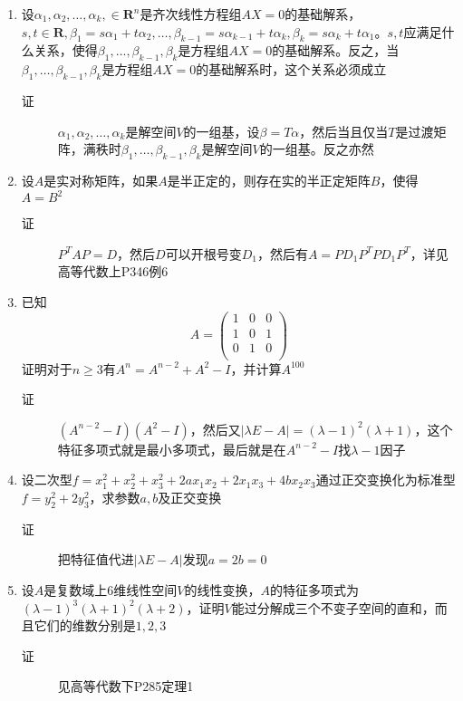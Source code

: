 \begin{enumerate}
\item 设$\alpha_1,\alpha_2,\dots,\alpha_k,\in \mathbf{R}^n$是齐次线性方程组$AX=0$的基础解系，$s,t\in \mathbf{R},\beta_1=s\alpha_1+t\alpha_2,\dots,\beta_{k-1}=s\alpha_{k-1}+t\alpha_k,\beta_k=s\alpha_k+t\alpha_1$。$s,t$应满足什么关系，使得$\beta_1,\dots,\beta_{k-1},\beta_k$是方程组$AX=0$的基础解系。反之，当$\beta_1,\dots,\beta_{k-1},\beta_k$是方程组$AX=0$的基础解系时，这个关系必须成立
\begin{description}
\item[证] $\alpha_1,\alpha_2,\dots,\alpha_k$是解空间$V$的一组基，设$\beta=T\alpha$，然后当且仅当$T$是过渡矩阵，满秩时$\beta_1,\dots,\beta_{k-1},\beta_k$是解空间$V$的一组基。反之亦然
\end{description}

\item 设$A$是实对称矩阵，如果$A$是半正定的，则存在实的半正定矩阵$B$，使得$A=B^2$
\begin{description}
\item[证] $P^TAP=D$，然后$D$可以开根号变$D_1$，然后有$A=PD_1P^TPD_1P^T$，详见高等代数上P346例6
\end{description}

\item 已知
\[
A = \left(
\begin{array}{ccc}
1 & 0 & 0 \\
1 & 0 & 1 \\
0 & 1 & 0 \\
\end{array}\right)
\]
证明对于$n\geq 3$有$A^n = A^{n-2} + A^2 - I$，并计算$A^{100}$
\begin{description}
\item[证] $(A^{n-2}-I)(A^2-I)$，然后又$|\lambda E-A|=(\lambda-1)^2(\lambda+1)$，这个特征多项式就是最小多项式，最后就是在$A^{n-2}-I$找$\lambda-1$因子
\end{description}

\item 设二次型$f=x_1^2 + x_2^2 + x_3^2 + 2ax_1x_2 + 2x_1x_3+4bx_2x_3$通过正交变换化为标准型$f=y_2^2+2y_3^2$，求参数$a,b$及正交变换
\begin{description}
\item[证] 把特征值代进$|\lambda E-A|$发现$a=2b=0$
\end{description}

\item 设$A$是复数域上$6$维线性空间$V$的线性变换，$A$的特征多项式为$(\lambda-1)^3(\lambda+1)^2(\lambda+2)$，证明$V$能过分解成三个不变子空间的直和，而且它们的维数分别是$1,2,3$
\begin{description}
\item[证] 见高等代数下P285定理1
\end{description}















\end{enumerate}